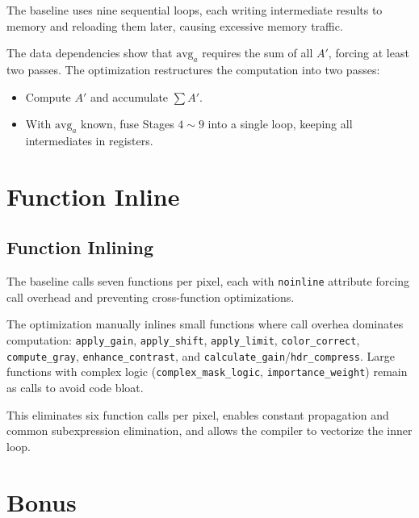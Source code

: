 \documentclass[11pt]{article}
\begin{document}


\noindent The baseline uses nine sequential loops, each writing intermediate results to memory and reloading them later, causing excessive memory traffic.

\vspace{0.3em}

\noindent The data dependencies show that $\text{avg}_a$ requires the sum of all $A'$, forcing at least two passes. The optimization restructures the computation into two passes:

\begin{itemize}
    \item Compute $A'$ and accumulate $\sum A'$.
    \item With $\text{avg}_a$ known, fuse Stages $4\sim 9$ into a single loop, keeping all intermediates in registers.
\end{itemize}

\section{Function Inline}

\subsection{Function Inlining}

The baseline calls seven functions per pixel, each with \texttt{noinline} attribute forcing call overhead and preventing cross-function optimizations.

\vspace{0.3em}

\noindent The optimization manually inlines small functions where call overhea dominates computation: \texttt{apply\_gain}, \texttt{apply\_shift}, \texttt{apply\_limit}, \texttt{color\_correct}, \texttt{compute\_gray}, \texttt{enhance\_contrast}, and \texttt{calculate\_gain}/\texttt{hdr\_compress}. Large functions with complex logic (\texttt{complex\_mask\_logic}, \texttt{importance\_weight}) remain as calls to avoid code bloat.

\vspace{0.3em}

\noindent This eliminates six function calls per pixel, enables constant propagation and common subexpression elimination, and allows the compiler to vectorize the inner loop.

\section{Bonus}
\end{document}
